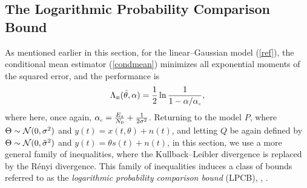 \documentclass[11pt,epsf]{article}
\newcommand{\tsig}{\tilde{\sigma}}
\newcommand{\ct}{\hat{\theta}}
\newcommand{\calN}{{\cal N}}
\begin{document}
\subsection{The Logarithmic Probability Comparison Bound}

As mentioned earlier in this section, for the linear--Gaussian 
model (\ref{ref}), the conditional mean
estimator (\ref{condmean}) minimizes all exponential moments of the squared error, and
the performance is
\begin{equation}
\Lambda_{\mbox{\tiny B}}(\ct,\alpha)=
\frac{1}{2}\ln\frac{1}{1-\alpha/
\alpha_{\mbox{\tiny c}}},
\end{equation}
where here, once again, $\alpha_{\mbox{\tiny
c}}=\frac{E_s}{N_0}+\frac{1}{2\sigma^2}$.
Returning to the model $P$, where $\Theta\sim\calN(0,\sigma^2)$ and
$y(t)=x(t,\theta)+n(t)$, and letting $Q$ be again defined by
$\Theta\sim\calN(0,\tsig^2)$ and
$y(t)=\theta s(t)+n(t)$, in this section, we use a more general family of
inequalities, where the Kullback--Leibler divergence is replaced
by the R\'enyi divergence. This family of inequalities induces a class of bounds 
referred to as the {\it logarithmic probability comparison bound} (LPCB),
\cite{ACD15}, \cite{AM15}.
\end{document}
